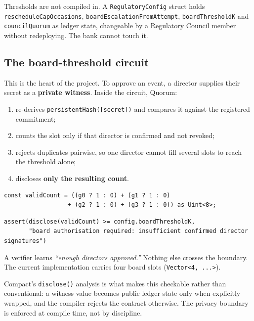 \documentclass[11pt,a4paper]{article}
\begin{document}
Thresholds are not compiled in. A \texttt{RegulatoryConfig} struct holds \texttt{rescheduleCapOccasions},
\texttt{boardEscalationFromAttempt}, \texttt{boardThresholdK} and \texttt{councilQuorum} as ledger state,
changeable by a Regulatory Council member without redeploying. The bank cannot touch it.

\subsection{The board-threshold circuit}

This is the heart of the project. To approve an event, a director supplies their secret as a
\textbf{private witness}. Inside the circuit, Quorum:

\begin{enumerate}
  \item re-derives \texttt{persistentHash([secret])} and compares it against the registered commitment;
  \item counts the slot only if that director is confirmed and not revoked;
  \item rejects duplicates pairwise, so one director cannot fill several slots to reach the threshold
    alone;
  \item discloses \textbf{only the resulting count}.
\end{enumerate}

\begin{Verbatim}
const validCount = ((g0 ? 1 : 0) + (g1 ? 1 : 0)
                  + (g2 ? 1 : 0) + (g3 ? 1 : 0)) as Uint<8>;
\end{Verbatim}

\begin{Verbatim}
assert(disclose(validCount) >= config.boardThresholdK,
       "board authorisation required: insufficient confirmed director signatures")
\end{Verbatim}

A verifier learns \emph{``enough directors approved.''} Nothing else crosses the boundary. The current
implementation carries four board slots (\texttt{Vector<4, ...>}).

Compact's \texttt{disclose()} analysis is what makes this checkable rather than conventional: a witness
value becomes public ledger state only when explicitly wrapped, and the compiler rejects the contract
otherwise. The privacy boundary is enforced at compile time, not by discipline.
\end{document}
